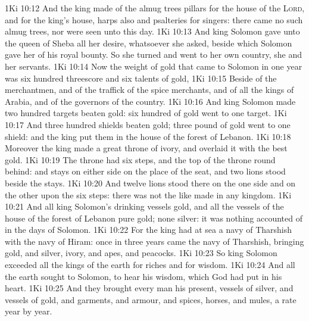 \vs 1Ki 10:12 And the king made of the almug trees pillars for the house of the \textsc{Lord}, and for the king's house, harps also and psalteries for singers: there came no such almug trees, nor were seen unto this day.
\vs 1Ki 10:13 And king Solomon gave unto the queen of Sheba all her desire, whatsoever she asked, beside  which Solomon gave her of his royal bounty. So she turned and went to her own country, she and her servants.
\vs 1Ki 10:14 Now the weight of gold that came to Solomon in one year was six hundred threescore and six talents of gold,
\vs 1Ki 10:15 Beside  of the merchantmen, and of the traffick of the spice merchants, and of all the kings of Arabia, and of the governors of the country.
\vs 1Ki 10:16 And king Solomon made two hundred targets  beaten gold: six hundred  of gold went to one target.
\vs 1Ki 10:17 And  three hundred shields  beaten gold; three pound of gold went to one shield: and the king put them in the house of the forest of Lebanon.
\vs 1Ki 10:18 Moreover the king made a great throne of ivory, and overlaid it with the best gold.
\vs 1Ki 10:19 The throne had six steps, and the top of the throne  round behind: and  stays on either side on the place of the seat, and two lions stood beside the stays.
\vs 1Ki 10:20 And twelve lions stood there on the one side and on the other upon the six steps: there was not the like made in any kingdom.
\vs 1Ki 10:21 And all king Solomon's drinking vessels  gold, and all the vessels of the house of the forest of Lebanon  pure gold; none  silver: it was nothing accounted of in the days of Solomon.
\vs 1Ki 10:22 For the king had at sea a navy of Tharshish with the navy of Hiram: once in three years came the navy of Tharshish, bringing gold, and silver, ivory, and apes, and peacocks.
\vs 1Ki 10:23 So king Solomon exceeded all the kings of the earth for riches and for wisdom.
\vs 1Ki 10:24 And all the earth sought to Solomon, to hear his wisdom, which God had put in his heart.
\vs 1Ki 10:25 And they brought every man his present, vessels of silver, and vessels of gold, and garments, and armour, and spices, horses, and mules, a rate year by year.
